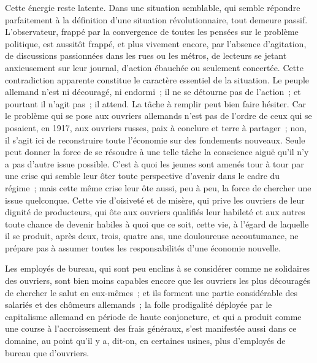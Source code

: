 \documentclass[french,twoside]{book} %
\begin{document}
\noindent Cette énergie reste latente. Dans une situation semblable, qui semble répondre parfaitement à la définition d'une situation révolutionnaire, tout demeure passif. L'observateur, frappé par la convergence de toutes les pensées sur le problème politique, est aussitôt frappé, et plus vivement encore, par l'absence d'agitation, de discussions passionnées dans les rues ou les métros, de lecteurs se jetant anxieusement sur leur journal, d'action ébauchée ou seulement concertée. Cette contradiction apparente constitue le caractère essentiel de la situation. Le peuple allemand n'est ni découragé, ni endormi ; il ne se détourne pas de l'action ; et pourtant il n'agit pas ; il attend. La tâche à remplir peut bien faire hésiter. Car le problème qui se pose aux ouvriers allemands n'est pas de l'ordre de ceux qui se posaient, en 1917, aux ouvriers russes, paix à conclure et terre à partager ; non, il s'agit ici de reconstruire toute l'économie sur des fondements nouveaux. Seule peut donner la force de se résoudre à une telle tâche la conscience aiguë qu'il n'y a pas d'autre issue possible. C'est à quoi les jeunes sont amenés tour à tour par une crise qui semble leur ôter toute perspective d'avenir dans le cadre du régime ; mais cette même crise leur ôte aussi, peu à peu, la force de chercher une issue quelcon­que. Cette vie d'oisiveté et de misère, qui prive les ouvriers de leur dignité de producteurs, qui ôte aux ouvriers qualifiés leur habileté et aux autres toute chance de devenir habiles à quoi que ce soit, cette vie, à l'égard de laquelle il se produit, après deux, trois, quatre ans, une douloureuse accoutumance, ne prépare pas à assumer toutes les responsabilités d'une économie nouvelle.\par
Les employés de bureau, qui sont peu enclins à se considérer comme ne solidaires des ouvriers, sont bien moins capables encore que les ouvriers les plus découragés de chercher le salut en eux-mêmes ; et ils forment une partie considérable des salariés et des chômeurs allemands ; la folle prodigalité déployée par le capitalisme allemand en période de haute conjoncture, et qui a produit comme une course à l'accroissement des frais généraux, s'est manifes­tée aussi dans ce domaine, au point qu'il y a, dit-on, en certaines usines, plus d'employés de bureau que d'ouvriers.\par
\end{document}
